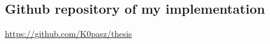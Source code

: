 \appendix
\chapter*{\fuggelek}
\setcounter{chapter}{\appendixnumber}

\section{Github repository of my implementation} \label{github_repo}

\url{https://github.com/K0pasz/thesis}

